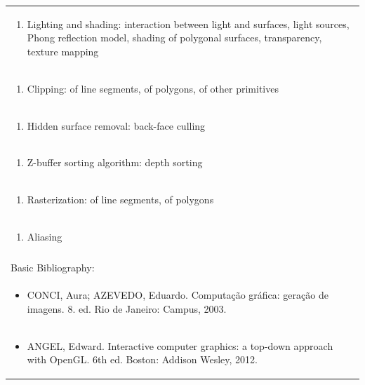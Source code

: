 \documentclass[11pt]{article}
\begin{document}
\begin{center}
\begin{longtable}{|p{4cm}|p{4cm}|p{4cm}|p{4cm}|}
\multicolumn{4}{|p{\dimexpr 16cm + 6\tabcolsep\relax}|}{\begin{enumerate}[start=11]\item Lighting and shading: interaction between light and surfaces, light sources, Phong reflection model, shading of polygonal surfaces, transparency, texture mapping\end{enumerate}}\\
\multicolumn{4}{|p{\dimexpr 16cm + 6\tabcolsep\relax}|}{\begin{enumerate}[start=12]\item Clipping: of line segments, of polygons, of other primitives\end{enumerate}}\\
\multicolumn{4}{|p{\dimexpr 16cm + 6\tabcolsep\relax}|}{\begin{enumerate}[start=13]\item Hidden surface removal: back-face culling\end{enumerate}}\\
\multicolumn{4}{|p{\dimexpr 16cm + 6\tabcolsep\relax}|}{\begin{enumerate}[start=14]\item Z-buffer sorting algorithm: depth sorting\end{enumerate}}\\
\multicolumn{4}{|p{\dimexpr 16cm + 6\tabcolsep\relax}|}{\begin{enumerate}[start=15]\item Rasterization: of line segments, of polygons\end{enumerate}}\\
\multicolumn{4}{|p{\dimexpr 16cm + 6\tabcolsep\relax}|}{\begin{enumerate}[start=16]\item Aliasing\end{enumerate}}\\
\multicolumn{4}{|p{\dimexpr 16cm + 6\tabcolsep\relax}|}{}\\
\hline
\multicolumn{4}{|p{16cm}|}{Basic Bibliography:}\\*
\multicolumn{4}{|p{\dimexpr 16cm + 6\tabcolsep\relax}|}{\begin{itemize}\item CONCI, Aura; AZEVEDO, Eduardo. Computação gráfica: geração de imagens. 8. ed. Rio de Janeiro: Campus, 2003.\end{itemize}}\\
\multicolumn{4}{|p{\dimexpr 16cm + 6\tabcolsep\relax}|}{\begin{itemize}\item ANGEL, Edward. Interactive computer graphics: a top-down approach with OpenGL. 6th ed. Boston: Addison Wesley, 2012.\end{itemize}}\\

\end{longtable}
\end{center}
\end{document}
